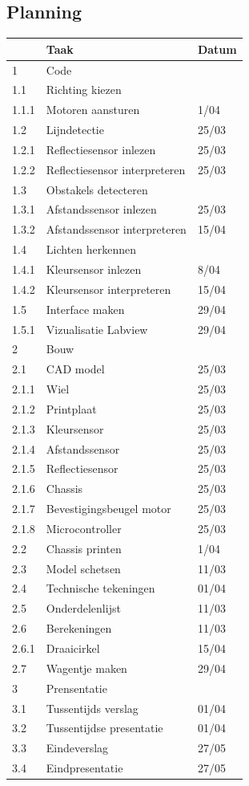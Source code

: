 \documentclass[kulak]{kulakarticle} %
\begin{document}
\subsection{Planning}
\begin{tabular}{lll}
	& Taak & Datum \\ \hline
	1 & Code & \\
	1.1 & Richting kiezen & \\
	1.1.1 & Motoren aansturen & 1/04 \\
	1.2 & Lijndetectie & 25/03 \\
	1.2.1 & Reflectiesensor inlezen & 25/03\\
	1.2.2 & Reflectiesensor interpreteren & 25/03 \\
	1.3 & Obstakels detecteren & \\
	1.3.1 & Afstandssensor inlezen & 25/03 \\
	1.3.2 & Afstandssensor interpreteren & 15/04\\
	1.4 & Lichten herkennen & \\
	1.4.1 & Kleursensor inlezen & 8/04\\
	1.4.2 & Kleursensor interpreteren &  15/04\\
	1.5 & Interface maken & 29/04 \\
	1.5.1 & Vizualisatie Labview & 29/04\\
	\hline
	2 & Bouw & \\
	2.1 & CAD model & 25/03\\
	2.1.1 & Wiel & 25/03\\
	2.1.2 & Printplaat & 25/03 \\
	2.1.3 & Kleursensor & 25/03\\
	2.1.4 & Afstandssensor & 25/03\\
	2.1.5 & Reflectiesensor & 25/03\\
	2.1.6 & Chassis & 25/03\\
	2.1.7 & Bevestigingsbeugel motor & 25/03\\
	2.1.8 & Microcontroller & 25/03\\
	2.2 & Chassis printen & 1/04\\
	2.3 & Model schetsen & 11/03\\
	2.4 & Technische tekeningen & 01/04\\
	2.5 & Onderdelenlijst & 11/03\\
	2.6 & Berekeningen & 11/03 \\
	2.6.1 & Draaicirkel & 15/04\\
	2.7 & Wagentje maken & 29/04\\
	\hline
	3 & Prensentatie & \\
	3.1 & Tussentijds verslag & 01/04 \\
	3.2 & Tussentijdse presentatie & 01/04\\
	3.3 & Eindeverslag & 27/05 \\
	3.4 & Eindpresentatie & 27/05\\ \hline
\end{tabular}
\end{document}
